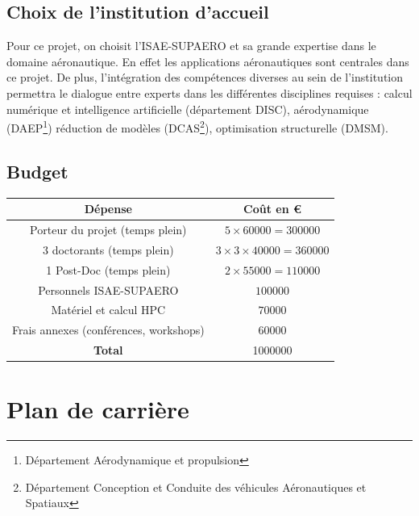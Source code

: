 \documentclass[12pt, french]{article}
\begin{document}
	
	\subsection{Choix de l'institution d'accueil}
	Pour ce projet, on choisit l'ISAE-SUPAERO et sa grande expertise dans le domaine aéronautique. En effet les applications aéronautiques sont centrales dans ce projet. De plus, l'intégration des compétences diverses au sein de l'institution permettra le dialogue entre experts dans les différentes disciplines requises : calcul numérique et intelligence artificielle (département DISC), aérodynamique (DAEP\footnote{Département Aérodynamique et propulsion}) réduction de modèles (DCAS\footnote{Département Conception et Conduite des véhicules Aéronautiques et Spatiaux}), optimisation structurelle (DMSM).
	
	
	\subsection{Budget}

	\begin{center}
		\begin{tabular}{|c|c|}
			\hline
			D\'epense & Co\^{u}t en \euro \\
			\hline
			Porteur du projet (temps plein) & $5\times 60000=300000$ \\
			3 doctorants (temps plein) & $3\times 3\times 40000=360000$  \\
			1 Post-Doc (temps plein) & $2\times 55000=110000$ \\
			Personnels ISAE-SUPAERO & $100000$ \\
			Matériel  et calcul HPC & $70000$ \\
			Frais annexes (conférences, workshops) & $60000$ \\
			\hline
			\textbf{Total} & 1000000 \\
			\hline
		\end{tabular}
	\end{center}
	
	
	
	
	
	
	\section{Plan de carrière}
	
\end{document}
